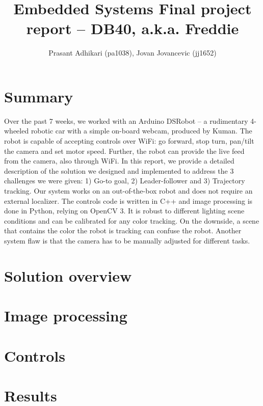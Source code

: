 \documentclass[12pt, twoside, a4paper, titlepage]{article}
\begin{document}
\title{Embedded Systems \linebreak Final project report -- DB40, a.k.a. Freddie }
\author{Prasant Adhikari (pa1038), Jovan Jovancevic (jj1652)}
\maketitle

\section{Summary}
Over the past 7 weeks, we worked with an Arduino DSRobot -- a rudimentary 4-wheeled robotic car with a simple on-board webcam, produced by Kuman. The robot is capable of accepting controls over WiFi: go forward, stop turn, pan/tilt the camera and set motor speed. Further, the robot can provide the live feed from the camera, also through WiFi. In this report, we provide a detailed description of the solution we designed and implemented to address the 3 challenges we were given: 1) Go-to goal, 2) Leader-follower and 3) Trajectory tracking. Our system works on an out-of-the-box robot and does not require an external localizer. The controls code is written in C++ and image processing is done in Python, relying on OpenCV 3. It is robust to different lighting scene conditions and can be calibrated for any color tracking. On the downside, a scene that contains the color the robot is tracking can confuse the robot. Another system flaw is that the camera has to be manually adjusted for different tasks.

\section{Solution overview}



\section{Image processing}

\section{Controls}

\section{Results}
\end{document}
